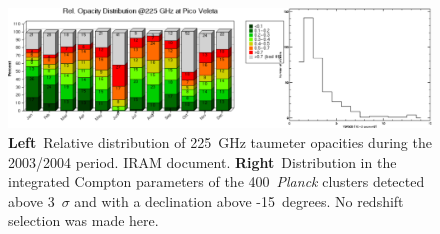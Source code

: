\documentclass[10pt,a4paper,twoside,graphicx,color]{article}
\begin{document}
\begin{figure}
  \begin{center}
   \includegraphics[width=0.95\columnwidth]{./Figures/RelTau2004AndSZclustersCrop.pdf}
  \end{center}
  \caption{{\bf Left}~Relative distribution of 225~GHz taumeter
    opacities during the 2003/2004 period. IRAM document.  {\bf
      Right}~Distribution in the integrated Compton parameters of the
    400~{\sl Planck} clusters detected above 3~$\sigma$ and with a
    declination above -15~degrees. No redshift selection was made
    here. }
\label{Fig:RelTau}
\end{figure}

\end{document}
